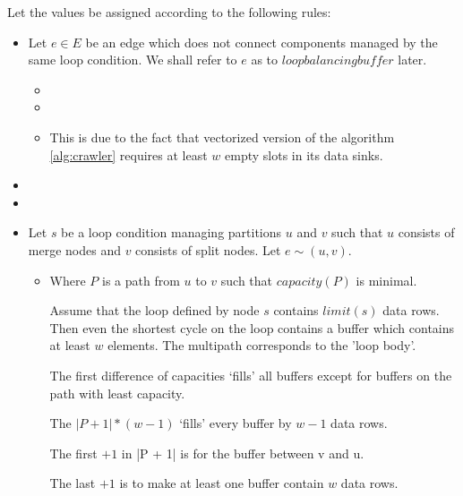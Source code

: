   Let the values be assigned according to the following rules:
  \begin{itemize}
    \item Let $e \in E$ be an edge which does not connect components managed by the same loop condition. We shall refer to $e$ as to $loop balancing buffer$ later.
    \begin{itemize}
      \item {}
      \item {}
      \item {}
        
        This is due to the fact that vectorized version of the algorithm \ref{alg:crawler} requires at least $w$ empty slots in its data sinks.

    \end{itemize}
    \item {}
    \item {} 
    \item Let $s$ be a loop condition managing partitions $u$ and $v$ such that $u$ consists of merge nodes and $v$ consists of split nodes. Let $e \sim (u,v)$.
    \begin{itemize}
      \item {} 

      Where $P$ is a path from $u$ to $v$ such that $capacity(P)$ is minimal.

        Assume that the loop defined by node $s$ contains $limit(s)$ data rows. Then even the shortest cycle on the loop contains a buffer which contains at least $w$ elements. The multipath corresponds to the 'loop body'. 
        
        The first difference of capacities `fills' all buffers except for buffers on the path with least capacity. 
        
        The $| P +1 | * (w-1)$ `fills' every buffer by $w-1$ data rows. 
        
        The first $+1$ in |P + 1| is for the buffer between v and u. 
        
        The last $+1$ is to make at least one buffer contain $w$ data rows.


\end{itemize}
\end{itemize}
